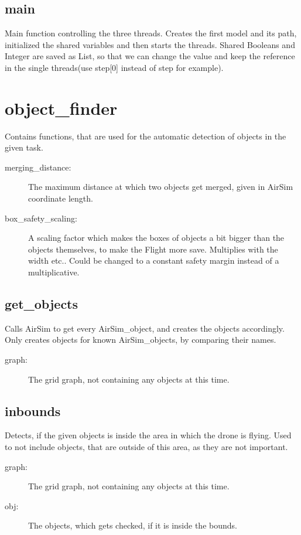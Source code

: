 \documentclass{article}
\begin{document}
\subsection{main}
Main function controlling the three threads. Creates the first model and its path, initialized the shared variables and then starts the threads. Shared Booleans and Integer are saved as List, so that we can change the value and keep the reference in the single threads(use step[0] instead of step for example).

\section{object\_finder}
Contains functions, that are used for the automatic detection of objects in the given task.

\begin{description}
    \item[merging\_distance:] The maximum distance at which two objects get merged, given in AirSim coordinate length.
    \item[box\_safety\_scaling:] A scaling factor which makes the boxes of objects a bit bigger than the objects themselves, to make the Flight more save. Multiplies with the width etc.. Could be changed to a constant safety margin instead of a multiplicative.
\end{description}

\subsection{get\_objects}
Calls AirSim to get every AirSim\_object, and creates the objects accordingly. Only creates objects for known AirSim\_objects, by comparing their names.

\begin{description}
    \item[graph:] The grid graph, not containing any objects at this time.
\end{description}

\subsection{inbounds}
Detects, if the given objects is inside the area in which the drone is flying. Used to not include objects, that are outside of this area, as they are not important.

\begin{description}
    \item[graph:] The grid graph, not containing any objects at this time.
    \item[obj:] The objects, which gets checked, if it is inside the bounds.
\end{description}
\end{document}
